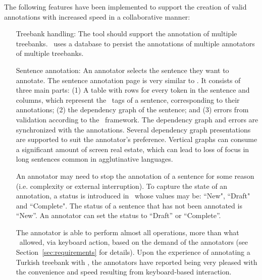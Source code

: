 The following features have been implemented to support the creation of valid annotations with increased speed in a collaborative manner:
\begin{itemize}[before=\normalfont, font=\itshape, align=left,noitemsep,topsep=0pt,parsep=3pt,partopsep=0pt,labelsep=3pt,align=left]
    \item[Treebank handling:]
        The tool should support the annotation of multiple treebanks.
        \boatvtwo\ uses a database to persist the annotations of multiple annotators of multiple treebanks.

    \item[Sentence annotation:]
    	An annotator selects the sentence they want to annotate.
        The sentence annotation page is very similar to \boatvone.
        It consists of three main parts: (1) A table with rows for every token in the sentence and columns, which represent the \ud\ tags of a sentence, corresponding to their annotations; (2) the dependency graph of the sentence; and (3) errors from validation according to the \ud\ framework.
        The dependency graph and errors are synchronized with the annotations.
        Several dependency graph presentations are supported to suit the annotator's preference.
        Vertical graphs can consume a significant amount of screen real estate, which can lead to loss of focus in long sentences common in agglutinative languages.

        An annotator may need to stop the annotation of a sentence for some reason (i.e. complexity or external interruption).
        To capture the state of an annotation, a status is introduced in \boatvtwo\ whose values may be: ``New", ``Draft" and ``Complete".
        The status of a sentence that has not been annotated is ``New''.
	    An annotator can set the status to ``Draft'' or ``Complete''.

        The annotator is able to perform almost all operations, more than what \boatvone\ allowed, via keyboard action, based on the demand of the annotators (see Section~\ref{sec:requirements} for details).
        Upon the experience of annotating a Turkish treebank with \boatvone, the annotators have reported being very pleased with the convenience and speed resulting from keyboard-based interaction.


\end{itemize}
